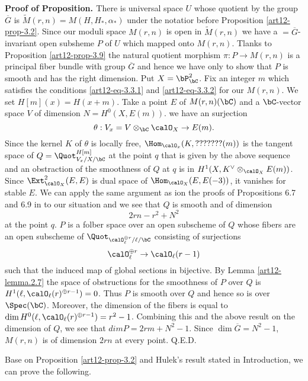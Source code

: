 \medskip
\noindent
{\bfseries  Proof of Proposition. \label{art12-prf-of-prop-3.2}} There is universal space $U$ whose quotient by the group $\overline{G}$ is $\tilde{M}(r, n)=M(H, H_{*}, \alpha_{*})$ under the notatior before Proposition \ref{art12-prop-3.2}. Since our moduli space $M(r,n)$ is open in $\tilde{M}(r,n)$ we have a $=\overline{G}$-invariant open subsheme $P$ of $U$ which mapped onto $M(r, n)$. Tlanks to Proposition \ref{art12-prop-3.9} the natural quotient morphism $\pi : P \rightarrow M (r, n)$ is a principal fiber bundle with group $\overline{G}$ and hence we have only to show that $P$ is smooth and has the right dimension. Put $X=\bP_{\bC}^{2}$. Fix an integer $m$ which satisfies the conditions
\eqref{art12-eq-3.3.1} and \eqref{art12-eq-3.3.2} for our $M(r, n)$. We set $H[m](x) =H(x +m)$. Take a point $E$ of
$M(r, n)(\bC)$ and a $\bC$-vector space $V$ of dimension $N=H^{0}(X, E(m))$. we have an surjection
$$
\theta : V_{x}=V\otimes_{\bC} \calO_{X}\rightarrow E(m).
$$
Since the kernel $K$ of $\theta$ is locally free, $\Hom_{\calO_{x}}(K, ???????(m))$ is the tangent space of $Q=\Quot_{V_{x}/X/\bC}^{H[m]}$ at the point $q$ that is given by the above sequence and an obstraction of the smoothness of $Q$ at $q$ is in $H^{1}(X, K^{\vee} \otimes_{\calO_{X}}E(m))$. Since $\Ext_{\calO_{X}}^{2}(E, E)$ is dual space of $\Hom_{\calO_{X}}(E, E(-3))$, it vanishes for stable $E$. We can apply the same argument as ion the proofs of Propositions 6.7 and 6.9 in \cite{art12-key5} to our situation and we see that $Q$ is smooth and of dimension
$$
2rn-r^{2} + N^{2}
$$
at the point $q$. $P$ is a folber space over an open subscheme of $Q$ whose fibers are an open subscheme of $\Quot_{\calO_{\ell}^{\oplus r}/\ell/\bC}$ consisting of surjections
$$
\calO_{\ell}^{\oplus r} \rightarrow \calO_{\ell}(r-1)
$$ 
such that the induced map of global sections in bijective. By Lemma \ref{art12-lemma.2.7} the space of obstructions for the smoothness of $P$ over $Q$ is\break $H^{1} (\ell,\calO_{\ell}(r)^{\oplus r-1}) =0$. Thus $P$ is smooth over $Q$ and hence so is over $\Spec(\bC)$. Moreover, the dimension of the fibers is equal to\break $\dim H^{0}(\ell, \calO_{\ell}(r)^{\oplus r-1})=r^{2}-1 $. Combining this and the above result on the dimension of $Q$, we see that $dim P=2rm +N^{2}-1$. Since $\dim\overline{G}=N^{2}-1$, $M(r,n)$ is of dimension $2rn$ at every point.
\hfill Q.E.D.

Base on Proposition \ref{art12-prop-3.2} and Hulek's result stated in Introduction, we can prove the following.


